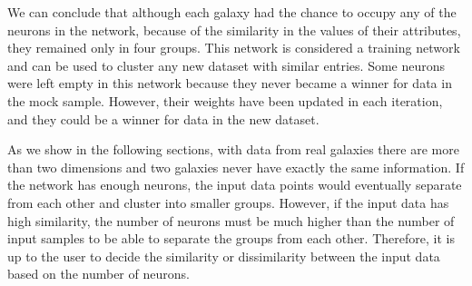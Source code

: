 We can conclude that although each galaxy had the chance to occupy any of the neurons in the network, because of the similarity in the values of their attributes, they remained only in four groups.
This network is considered a training network and can be used to cluster any new dataset with similar entries.
Some neurons were left empty in this network because they never became a winner for data in the mock sample.
However, their weights have been updated in each iteration, and they could be a winner for data in the new dataset.


As we show in the following sections, with data from real galaxies there are more than two dimensions and two galaxies never have exactly the same information. 
If the network has enough neurons, the input data points would eventually separate from each other and cluster into smaller groups. 
However, if the input data has high similarity, the number of neurons must be much higher than the number of input samples to be able to separate the groups from each other. 
Therefore, it is up to the user to decide the similarity or dissimilarity between the input data based on the number of neurons. 
